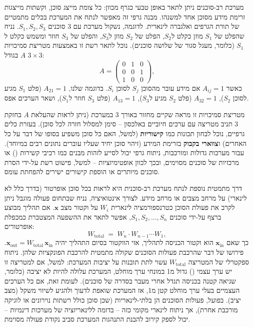 

מערכת רב-סוכנים ניתן לתאר באופן טבעי כגרף מכוון: כל צומת מייצג סוכן, וקשתות מייצגות זרימת מידע מסוכן אחד למשנהו. מבנה גרפי זה מאפשר לנתח את המערכת בכלים מתמטיים של תורת הגרפים ואלגברה לינארית. לדוגמה, נשקול מערכת עם $\num{3}$ סוכנים $S_1, S_2, S_3$. נניח שהפלט של $S_1$ מוזן כקלט ל\en{-}$S_2$, הפלט של $S_2$ מוזן ל\en{-}$S_3$, והפלט של $S_3$ חוזר ומשמש כקלט ל\en{-}$S_1$ (כלומר, מעגל סגור של שלושה סוכנים). נוכל לתאר רשת זו באמצעות מטריצת סמיכויות $A$ בגודל $\num{3}\times \num{3}$:
\[
A = \begin{pmatrix}
0 & 1 & 0\\
0 & 0 & 1\\
1 & 0 & 0
\end{pmatrix},
\]
כאשר $A_{ij}=\num{1}$ אם מידע עובר מהסוכן $S_j$ לסוכן $S_i$. בדוגמה שלנו, $A_{21}=\num{1}$ (פלט $S_1$ מגיע לסוכן $S_2$), $A_{32}=\num{1}$ (פלט $S_2$ מגיע ל\en{-}$S_3$), $A_{13}=\num{1}$ (פלט $S_3$ חוזר ל\en{-}$S_1$), ושאר הערכים אפס.

מטריצת סמיכויות זו מראה שקיים מחזור באורך \num{3} במערכת (ניתן לראות שהעלאת $A$ בחזקת \num{3} תניב מטריצה עם ערכים חיוביים באלכסון – סימן למסלול חזרה לכל סוכן). בעזרת כלים גרפיים, נוכל לבחון תכונות כמו \textbf{קישוריות} (למשל, האם כל סוכן משפיע בסופו של דבר על כל האחרים) ו\textbf{צווארי בקבוק} בזרימת המידע (זיהוי סוכן יחיד שעליו עוברים נתונים רבים במיוחד). עבור מערכות גדולות ומורכבות, ניתוח גרפי יכול לסייע לזהות מבנים כמו רכיבי קשירות () או מרכזיות של סוכנים מסוימים, ובכך לכוון אופטימיזציות – למשל, פישוט רשת על-ידי הסרת סוכנים מיותרים או הוספת קישורים ישירים להפחתת עומס.


דרך מתמטית נוספת לנתח מערכת רב-סוכנית היא לראות בכל סוכן אופרטור (בדרך כלל לא לינארי) על מרחב מצבים או מרחב מידע. לצורך אינטואיציה, נניח שבתחום פעולה מוגבל ניתן לקרב את פעולת הסוכן כטרנספורמציה לינארית $W_i$ על וקטור מצב $\mathbf{x}$. אם תהליך מבוצע ברצף על-ידי סוכנים $S_1, S_2, \dots, S_n$, אפשר לתאר את ההשפעה המצטברת כמכפלת אופרטורים:
\[
W_{\text{total}} \;=\; W_n \cdot W_{n-1} \cdots W_1,
\]
כך שאם $\mathbf{x}_{\text{in}}$ הוא וקטור הכניסה לתהליך, אזי הווקטור בסיום התהליך יהיה $\mathbf{x}_{\text{out}} = W_{\text{total}}\, \mathbf{x}_{\text{in}}$. פירושו של דבר שהרכבת פעולות הסוכנים שקולה מתמטית להרכבת הפונקציות שלהן. ניתוח ספקטרלי של המטריצה $W_{\text{total}}$ עשוי לתת תובנות על יציבות המערכת: למשל, אם למטריצה זו יש ערך עצמי () גדול מ\en{-}\num{1} במונחי ערך מוחלט, המערכת עלולה להיות לא יציבה (כלומר, שגיאה קטנה בכניסה תגדל אחרי מעבר בסדרה של סוכנים). לעומת זאת, אם כל הערכים העצמיים בעלי ערך מוחלט קטן מ\en{-}\num{1}, אז המערכת שואפת לדעוך ולהגיע לשיווי משקל (מצב יציב). בפועל, פעולות הסוכנים הן בלתי-לינאריות (שכן סוכן  כולל רשתות נוירונים או לוגיקה מורכבת אחרת), אך ניתוח לינארי מקומי כזה – בדומה ללינאריזציה של מערכות דינמיות – יכול לספק קירוב להבנת התנהגות המערכת סביב נקודת פעולה מסוימת.


